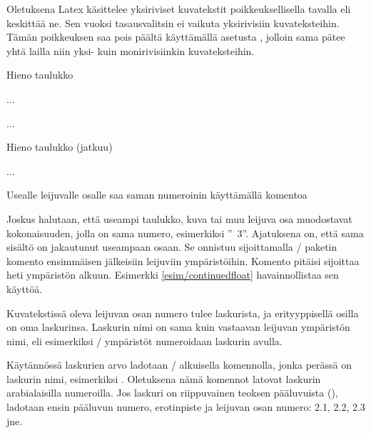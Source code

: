 \begin{koodilohkosis}
\end{koodilohkosis}

Oletuksena Latex käsittelee yksiriviset kuvatekstit poikkeuksellisella
tavalla eli keskittää ne. Sen vuoksi tasausvalitsin
 ei vaikuta yksirivisiin kuvateksteihin. Tämän
poikkeuksen saa pois päältä käyttämällä asetusta
, jolloin sama
 pätee yhtä lailla niin yksi- kuin monirivisiinkin
kuvateksteihin.

\begin{esimerkki*}

\begin{koodilohko}
\begin{table}                 %
  \caption{Hieno taulukko}
  ...
\end{table}
...
\begin{table}                 %
  \ContinuedFloat             %
  \caption{Hieno taulukko (jatkuu)}
  ...
\end{table}
\end{koodilohko}

  \caption{Usealle leijuvalle osalle saa saman numeroinin käyttämällä
    komentoa }
  \label{esim/continuedfloat}
\end{esimerkki*}

Joskus halutaan, että useampi taulukko, kuva tai muu leijuva osa
muodostavat kokonaisuuden, jolla on sama numero, esimerkiksi
''\tablename~3''. Ajatuksena on, että sama sisältö on jakautunut
useampaan osaan. Se onnistuu sijoittamalla \-/ paketin
komento  ensimmäisen jälkeisiin leijuviin
ympäristöihin. Komento pitäisi sijoittaa heti ympäristön alkuun.
Esimerkki \ref{esim/continuedfloat} havainnollistaa sen käyttöä.

Kuvatekstissä oleva leijuvan osan numero tulee laskurista, ja
erityyppisellä osilla on oma laskurinsa. Laskurin nimi on sama kuin
vastaavan leijuvan ympäristön nimi, eli esimerkiksi \-/
ympäristöt numeroidaan laskurin  avulla.

Käytännössä laskurien arvo ladotaan \-/ alkuisella
komennolla, jonka perässä on laskurin nimi, esimerkiksi
. Oletuksena nämä komennot latovat laskurin
arabialaisilla numeroilla. Jos laskuri on riippuvainen teoksen
pääluvuista (), ladotaan ensin pääluvun numero,
erotinpiste ja leijuvan osan numero: 2.1, 2.2, 2.3 jne.

